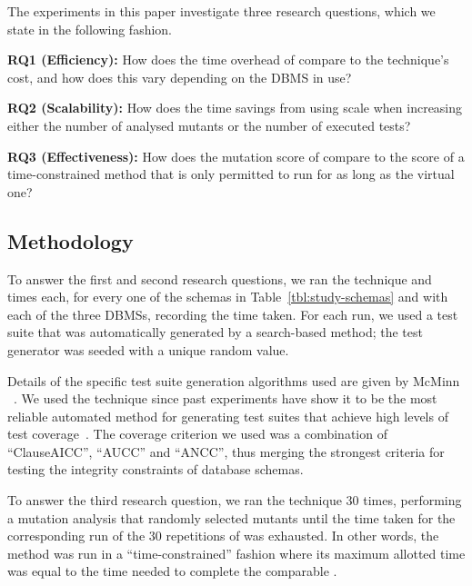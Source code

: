 The experiments in this paper investigate three research questions, which we state in the following fashion.

\vspace{5pt}

\noindent
\textbf{RQ1 (Efficiency):} How does the time overhead of \vma compare to the \Standard technique's cost, and how does
this vary depending on the DBMS in use?

\vspace{5pt}

\noindent
\textbf{RQ2 (Scalability):} How does the time savings from using \vma scale when increasing either the number
of analysed mutants or the number of executed tests?

\vspace{5pt}

\noindent
\textbf{RQ3 (Effectiveness):} How does the mutation score of \vma compare to the score of a time-constrained method that
is only permitted to run for as long as the virtual one?

\subsection{Methodology}
\label{sec:methodology}

To answer the first and second research questions, we ran the \Original technique and  times each, for every one of the schemas in Table~\ref{tbl:study-schemas} and with each of the three DBMSs, recording the time taken. For each run, we used a test suite that was automatically generated by a search-based method; the test generator was seeded with a unique random value.

Details of the specific test suite generation algorithms used are given by McMinn \etal~\cite{McMinn2015}. We used the \AVM technique since past experiments have show it to be the most reliable automated method for generating test suites that achieve high levels of test coverage~\cite{McMinn2015}. The coverage criterion we used was a combination of ``ClauseAICC'', ``AUCC'' and ``ANCC'', thus merging the strongest criteria for testing the integrity constraints of database schemas.

To answer the third research question, we ran the \Original technique 30 times, performing a mutation analysis that randomly selected mutants until the time taken for the corresponding run of the 30 repetitions of \vma was exhausted. In other words, the \Original method was run in a ``time-constrained'' fashion where its maximum allotted time was equal to the time needed to complete the comparable \vma.

